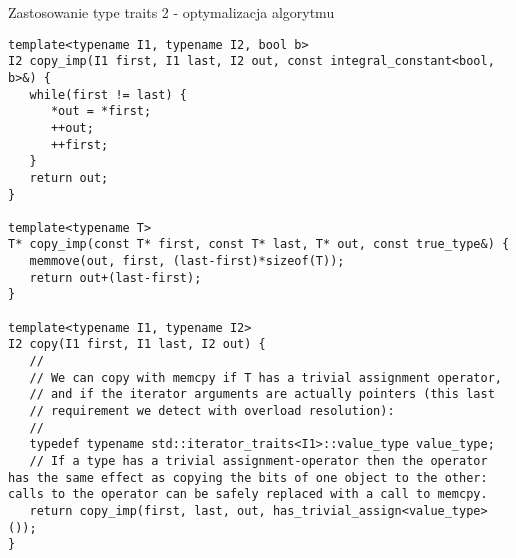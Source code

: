 \documentclass[11pt]{beamer}
\begin{document}
\begin{frame}[fragile]{Zastosowanie type traits 2 - optymalizacja algorytmu}
 \begin{lstlisting}[frame=single,basicstyle=\tiny]
template<typename I1, typename I2, bool b>
I2 copy_imp(I1 first, I1 last, I2 out, const integral_constant<bool, b>&) {
   while(first != last) {
      *out = *first;
      ++out;
      ++first;
   }
   return out;
}

template<typename T>
T* copy_imp(const T* first, const T* last, T* out, const true_type&) {
   memmove(out, first, (last-first)*sizeof(T));
   return out+(last-first);
}

template<typename I1, typename I2>
I2 copy(I1 first, I1 last, I2 out) {
   //
   // We can copy with memcpy if T has a trivial assignment operator,
   // and if the iterator arguments are actually pointers (this last
   // requirement we detect with overload resolution):
   //
   typedef typename std::iterator_traits<I1>::value_type value_type;
   // If a type has a trivial assignment-operator then the operator has the same effect as copying the bits of one object to the other: calls to the operator can be safely replaced with a call to memcpy.
   return copy_imp(first, last, out, has_trivial_assign<value_type>());
}
    \end{lstlisting}
\end{frame}
\end{document}

